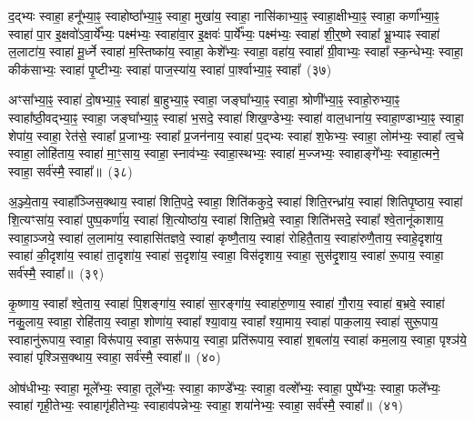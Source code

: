 {\anuvakamend[{पु॒रु॒रूपा॑य॒ स्वाहा॒ दश॑ च}]}%

द॒द्भ्यः स्वाहा॒ हनू᳚भ्या॒ꣴ॒ स्वाहोष्ठा᳚भ्या॒ꣴ॒ स्वाहा॒ मुखा॑य॒ स्वाहा॒ नासि॑काभ्या॒ꣴ॒ स्वाहा॒क्षीभ्या॒ꣴ॒ स्वाहा॒ कर्णा᳚भ्या॒ꣴ॒ स्वाहा॑ पा॒र इ॒क्षवो॑\-ऽवा॒र्ये᳚भ्यः॒ पक्ष्म॑भ्यः॒ स्वाहा॑वा॒र इ॒क्षवः॑ पा॒र्ये᳚भ्यः॒ पक्ष्म॑भ्यः॒ स्वाहा॑ शी॒र्॒\mbox{}ष्णे स्वाहा᳚ भ्रू॒भ्याꣴ स्वाहा॑ ल॒लाटा॑य॒ स्वाहा॑ मू॒र्ध्ने स्वाहा॑ म॒स्तिष्का॑य॒ स्वाहा॒ केशे᳚भ्यः॒ स्वाहा॒ वहा॑य॒ स्वाहा᳚ ग्री॒वाभ्यः॒ स्वाहा᳚ स्क॒न्धेभ्यः॒ स्वाहा॒ कीक॑साभ्यः॒ स्वाहा॑ पृ॒ष्टीभ्यः॒ स्वाहा॑ पाज॒स्या॑य॒ स्वाहा॑ पा॒र्श्वाभ्या॒ꣴ॒ स्वाहा᳚~(३७)\ip

अꣳसा᳚भ्या॒ꣴ॒ स्वाहा॑ दो॒षभ्या॒ꣴ॒ स्वाहा॑ बा॒हुभ्या॒ꣴ॒ स्वाहा॒ जङ्घा᳚भ्या॒ꣴ॒ स्वाहा॒ श्रोणी᳚भ्या॒ꣴ॒ स्वाहो॒रुभ्या॒ꣴ॒ स्वाहा᳚ष्ठी॒वद्भ्या॒ꣴ॒ स्वाहा॒ जङ्घा᳚भ्या॒ꣴ॒ स्वाहा॑ भ॒सदे॒ स्वाहा॑ शिख॒ण्डेभ्यः॒ स्वाहा॑ वाल॒धाना॑य॒ स्वाहा॒ण्डाभ्या॒ꣴ॒ स्वाहा॒ शेपा॑य॒ स्वाहा॒ रेत॑से॒ स्वाहा᳚ प्र॒जाभ्यः॒ स्वाहा᳚ प्र॒जन॑नाय॒ स्वाहा॑ प॒द्भ्यः स्वाहा॑ श॒फेभ्यः॒ स्वाहा॒ लोम॑भ्यः॒ स्वाहा᳚ त्व॒चे स्वाहा॒ लोहि॑ताय॒ स्वाहा॑ मा॒ꣳ॒साय॒ स्वाहा॒ स्नाव॑भ्यः॒ स्वाहा॒स्थभ्यः॒ स्वाहा॑ म॒ज्जभ्यः॒ स्वाहाङ्गे᳚भ्यः॒ स्वाहा॒त्मने॒ स्वाहा॒ सर्व॑स्मै॒ स्वाहा᳚॥~(३८)\ip

{\anuvakamend[{पा॒र्श्वाभ्या॒ꣴ॒ स्वाहा॑ म॒ज्जभ्यः॒ स्वाहा॒ षट्च॑}]}%

अ॒ञ्ज्ये॒ताय॒ स्वाहा᳚ञ्जिस॒क्थाय॒ स्वाहा॑ शिति॒पदे॒ स्वाहा॒ शिति॑ककुदे॒ स्वाहा॑ शिति॒रन्ध्रा॑य॒ स्वाहा॑ शितिपृ॒ष्ठाय॒ स्वाहा॑ शि॒त्यꣳसा॑य॒ स्वाहा॑ पुष्प॒कर्णा॑य॒ स्वाहा॑ शि॒त्योष्ठा॑य॒ स्वाहा॑ शिति॒भ्रवे॒ स्वाहा॒ शिति॑भसदे॒ स्वाहा᳚ श्वे॒तानू॑काशाय॒ स्वाहा॒ञ्जये॒ स्वाहा॑ ल॒लामा॑य॒ स्वाहासि॑तज्ञवे॒ स्वाहा॑ कृष्णै॒ताय॒ स्वाहा॑ रोहितै॒ताय॒ स्वाहा॑रुणै॒ताय॒ स्वाहे॒दृशा॑य॒ स्वाहा॑ की॒दृशा॑य॒ स्वाहा॑ ता॒दृशा॑य॒ स्वाहा॑ स॒दृशा॑य॒ स्वाहा॒ विस॑दृशाय॒ स्वाहा॒ सुस॑दृ॒शाय॒ स्वाहा॑ रू॒पाय॒ स्वाहा॒ सर्व॑स्मै॒ स्वाहा᳚॥~(३९)\ip

{\anuvakamend[{रू॒पाय॒ स्वाहा॒ द्वे च॑}]}%

कृ॒ष्णाय॒ स्वाहा᳚ श्वे॒ताय॒ स्वाहा॑ पि॒शङ्गा॑य॒ स्वाहा॑ सा॒रङ्गा॑य॒ स्वाहा॑रु॒णाय॒ स्वाहा॑ गौ॒राय॒ स्वाहा॑ ब॒भ्रवे॒ स्वाहा॑ नकु॒लाय॒ स्वाहा॒ रोहि॑ताय॒ स्वाहा॒ शोणा॑य॒ स्वाहा᳚ श्या॒वाय॒ स्वाहा᳚ श्या॒माय॒ स्वाहा॑ पाक॒लाय॒ स्वाहा॑ सुरू॒पाय॒ स्वाहानु॑रूपाय॒ स्वाहा॒ विरू॑पाय॒ स्वाहा॒ सरू॑पाय॒ स्वाहा॒ प्रति॑रूपाय॒ स्वाहा॑ श॒बला॑य॒ स्वाहा॑ कम॒लाय॒ स्वाहा॒ पृश्ञ॑ये॒ स्वाहा॑ पृश्ञिस॒क्थाय॒ स्वाहा॒ सर्व॑स्मै॒ स्वाहा᳚॥~(४०)\ip

{\anuvakamend[{कृ॒ष्णाय॒ षट्च॑त्वारिꣳशत्}]}%

ओष॑धीभ्यः॒ स्वाहा॒ मूले᳚भ्यः॒ स्वाहा॒ तूले᳚भ्यः॒ स्वाहा॒ काण्डे᳚भ्यः॒ स्वाहा॒ वल्\mbox{}शे᳚भ्यः॒ स्वाहा॒ पुष्पे᳚भ्यः॒ स्वाहा॒ फले᳚भ्यः॒ स्वाहा॑ गृही॒तेभ्यः॒ स्वाहागृ॑हीतेभ्यः॒ स्वाहाव॑पन्नेभ्यः॒ स्वाहा॒ शया॑नेभ्यः॒ स्वाहा॒ सर्व॑स्मै॒ स्वाहा᳚॥~(४१)\ip

